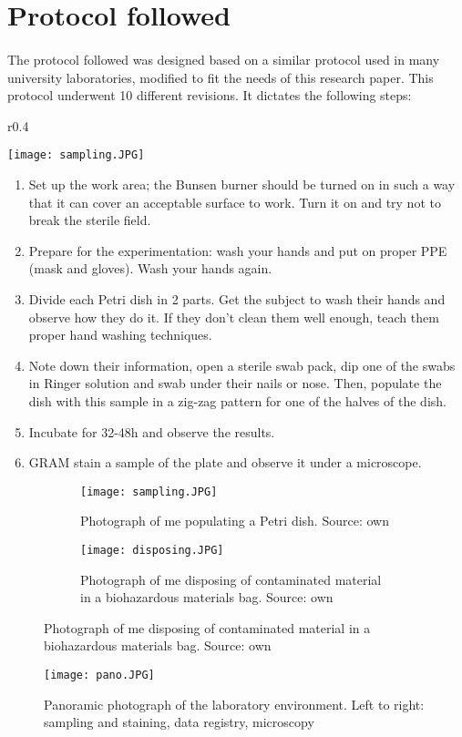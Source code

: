 \section{Protocol followed}
\paragraph{}The protocol followed was designed based on a similar protocol used in many university laboratories\cite{olearyPracticalHandbookMicrobiology1989}, modified to fit the needs of this research paper. This protocol underwent 10 different revisions. It dictates the following steps: \newline\begin{wrapfigure}{r}{0.4\textwidth}\begin{center}\texttt{[image: sampling.JPG]}\end{center}\caption{  }\end{wrapfigure}
\begin{enumerate}[label=\arabic*)]
\item Set up the work area; the Bunsen burner should be turned on in such a way that it can cover an acceptable surface to work. Turn it on and try not to break the sterile field.
\item Prepare for the experimentation: wash your hands and put on proper PPE (mask and gloves). Wash your hands again.
\item Divide each Petri dish in 2 parts. Get the subject to wash their hands and observe how they do it. If they don't clean them well enough, teach them proper hand washing techniques.
\item Note down their information, open a sterile swab pack, dip one of the swabs in Ringer solution and swab under their nails or nose. Then, populate the dish with this sample in a zig-zag pattern for one of the halves of the dish.
\item Incubate for 32-48h and observe the results.
\item GRAM stain a sample of the plate and observe it under a microscope.
\end{enumerate}
\begin{figure}[h!] \centering \begin{subfigure}[b]{0.4\linewidth} \texttt{[image: sampling.JPG]} \caption{Photograph of me populating a Petri dish. Source: own} \end{subfigure} \begin{subfigure}[b]{0.4\linewidth} \texttt{[image: disposing.JPG]} \caption{Photograph of me disposing of contaminated material in a biohazardous materials bag. Source: own} \end{subfigure}\label{fig:coffee}\end{figure}
\begin{center}\begin{figure}[H]\centering\texttt{[image: pano.JPG]}\caption{Panoramic photograph of the laboratory environment. Left to right: sampling and staining, data registry, microscopy}\end{figure}\end{center}
\newpage